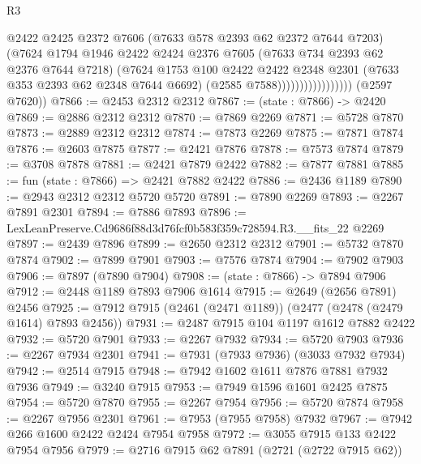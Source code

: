 \begin{lexlean}{R3}
\begin{coremodule}
                                  @2422
                                  @2425
                                  @2372
                                  @7606
                                  (@7633 @578 @2393 @62 @2372 @7644 @7203)
                                  (@7624
                                    @1794
                                    @1946
                                    @2422
                                    @2424
                                    @2376
                                    @7605
                                    (@7633 @734 @2393 @62 @2376 @7644 @7218)
                                    (@7624
                                      @1753
                                      @100
                                      @2422
                                      @2422
                                      @2348
                                      @2301
                                      (@7633 @353 @2393 @62 @2348 @7644 @6692)
                                      (@2585 @7588)))))))))))))))))
      (@2597 @7620))
@7866 := @2453 @2312 @2312
@7867 := (state : @7866) -> @2420
@7869 := @2886 @2312 @2312
@7870 := @7869 @2269
@7871 := @5728 @7870
@7873 := @2889 @2312 @2312
@7874 := @7873 @2269
@7875 := @7871 @7874
@7876 := @2603 @7875
@7877 := @2421 @7876
@7878 := @7573 @7874
@7879 := @3708 @7878
@7881 := @2421 @7879 @2422
@7882 := @7877 @7881
@7885 := fun (state : @7866) => @2421 @7882 @2422
@7886 := @2436 @1189
@7890 := @2943 @2312 @2312 @5720 @5720
@7891 := @7890 @2269
@7893 := @2267 @7891 @2301
@7894 := @7886 @7893
@7896 := LexLeanPreserve.Cd9686f88d3d76fcf0b583f359c728594.R3.__fits_22 @2269
@7897 := @2439 @7896
@7899 := @2650 @2312 @2312
@7901 := @5732 @7870 @7874
@7902 := @7899 @7901
@7903 := @7576 @7874
@7904 := @7902 @7903
@7906 := @7897 (@7890 @7904)
@7908 := (state : @7866) -> @7894 @7906
@7912 := @2448 @1189 @7893 @7906 @1614
@7915 := @2649 (@2656 @7891) @2456
@7925 := @7912 @7915 (@2461 (@2471 @1189)) (@2477 (@2478 (@2479 @1614) @7893 @2456))
@7931 := @2487 @7915 @104 @1197 @1612 @7882 @2422
@7932 := @5720 @7901
@7933 := @2267 @7932
@7934 := @5720 @7903
@7936 := @2267 @7934 @2301
@7941 := @7931 (@7933 @7936) (@3033 @7932 @7934)
@7942 := @2514 @7915
@7948 := @7942 @1602 @1611 @7876 @7881 @7932 @7936
@7949 := @3240 @7915
@7953 := @7949 @1596 @1601 @2425 @7875
@7954 := @5720 @7870
@7955 := @2267 @7954
@7956 := @5720 @7874
@7958 := @2267 @7956 @2301
@7961 := @7953 (@7955 @7958) @7932
@7967 := @7942 @266 @1600 @2422 @2424 @7954 @7958
@7972 := @3055 @7915 @133 @2422 @7954 @7956
@7979 := @2716 @7915 @62 @7891 (@2721 (@2722 @7915 @62))

\end{coremodule}
\end{lexlean}
